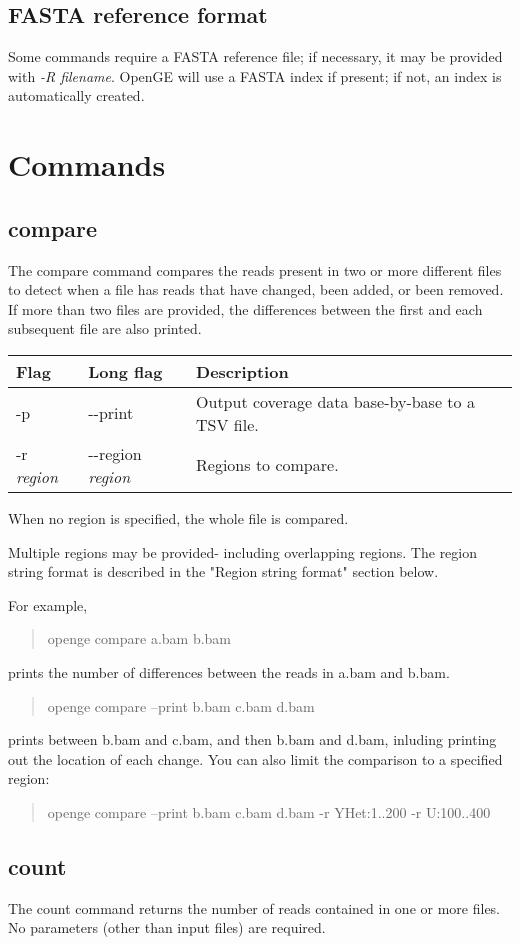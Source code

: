 \documentclass[11pt]{article}
\newcommand {\cmd}[1] {\begin{quote}#1\end{quote}}
\begin{document}
\subsection{FASTA reference format}
Some commands require a FASTA reference file; if necessary, it may be provided with \textit{-R filename}. OpenGE will use a FASTA index if present; if not, an index is automatically created.

\section {Commands}

\subsection {compare}
The compare command compares the reads present in two or more different files to detect when a file has reads that have changed, been added, or been removed. If more than two files are provided, the differences between the first and each subsequent file are also printed.

\begin{center}
\begin{tabular}{llp{3.5in}}
\hline
Flag&Long flag&Description\\ \hline
-p&{-}{-}print&Output coverage data base-by-base to a TSV file.\\
-r  \textit{region}&{-}{-}region \textit{region}&Regions to compare.\\
\end{tabular}
\end{center}

When no region is specified, the whole file is compared.

Multiple regions may be provided- including overlapping regions. The region string format is described in the "Region string format" section below.

For example,
\cmd{openge compare a.bam b.bam}
prints the number of differences between the reads in a.bam and b.bam.
\cmd{openge compare --print b.bam c.bam d.bam}
prints between b.bam and c.bam, and then b.bam and d.bam, inluding printing out the location of each change. You can also limit the comparison to a specified region:
\cmd{openge compare --print b.bam c.bam d.bam -r YHet:1..200 -r U:100..400}

\subsection {count}
The count command returns the number of reads contained in one or more files. No parameters (other than input files) are required.
\end{document}
